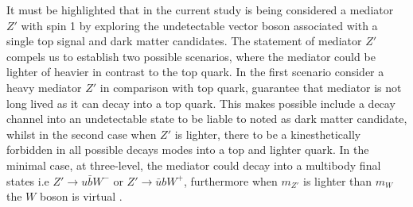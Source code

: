 It must be highlighted that in the current study is  being considered a mediator $Z'$ with spin 1 by exploring the undetectable vector boson associated with a single top signal and dark matter candidates. The statement of mediator $Z'$ compels us to establish two possible scenarios, where the mediator could be lighter of heavier in contrast to the top quark. In the first scenario consider a heavy mediator $Z'$ in comparison with top quark, guarantee that mediator is not long lived as it can decay into a top quark. This makes possible include a decay channel into an undetectable state to be liable to noted as dark matter candidate, whilst in the second case when $Z'$ is lighter, there to be a kinesthetically forbidden in all possible decays modes into a top and lighter quark. In the minimal case, at three-level, the mediator could decay into a multibody final states i.e $Z'\rightarrow u\bar{b}W^{-}$ or $Z'\rightarrow \bar{u}bW^{+}$, furthermore when $m_{Z'}$ is lighter than $m_{W}$ the $W$ boson is virtual \cite{324}. 


\clearpage
